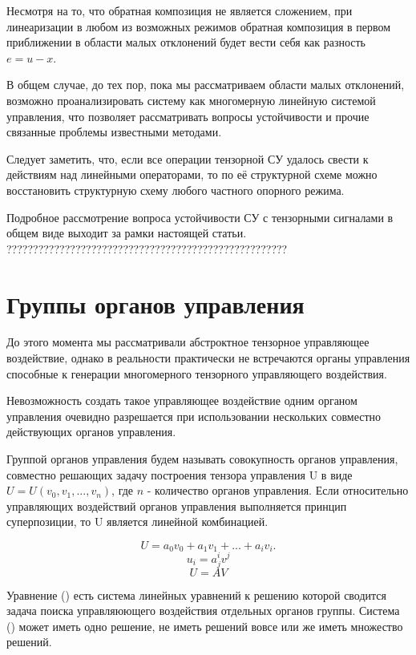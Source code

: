 \documentclass[a4paper]{article}
\begin{document}
Несмотря на то, что обратная композиция не является сложением, при линеаризации в любом из возможных режимов обратная композиция в первом приближении в области малых отклонений будет вести себя как разность $e = u - x$. 

В общем случае, до тех пор, пока мы рассматриваем области малых отклонений, возможно проанализировать систему как многомерную линейную системой управления, что позволяет рассматривать вопросы устойчивости и прочие связанные проблемы известными методами. 

Следует заметить, что, если все операции тензорной СУ удалось свести к действиям над линейными операторами, то по её структурной схеме можно восстановить структурную схему любого частного опорного режима.

Подробное рассмотрение вопроса устойчивости СУ с тензорными сигналами в общем виде выходит за рамки настоящей статьи.
?????????????????????????????????????????????????????

\section{Группы органов управления}
До этого момента мы рассматривали абстроктное тензорное управляющее воздействие, однако в реальности практически не встречаются органы управления способные к генерации многомерного тензорного управляющего воздействия.

Невозможность создать такое управляющее воздействие одним органом управления очевидно разрешается при использовании нескольких совместно действующих органов управления.

Группой органов управления будем называть совокупность органов управления, совместно решающих задачу построения тензора управления U в виде $U = U(v_0, v_1, ..., v_n)$, где $n$ - количество органов управления. Если относительно управляющих воздействий органов управления выполняется принцип суперпозиции, то U является линейной комбинацией. 

\begin{equation}U = a_0v_0 + a_1v_1 + ... + a_iv_i.\end{equation}
\begin{equation}u_i=a^i_jv^j\end{equation}
\begin{equation}U = AV\end{equation}

Уравнение () есть система линейных уравнений к решению которой сводится задача поиска управляюющего воздействия отдельных органов группы. Система () может иметь одно решение, не иметь решений вовсе или же иметь множество решений.
\end{document}
